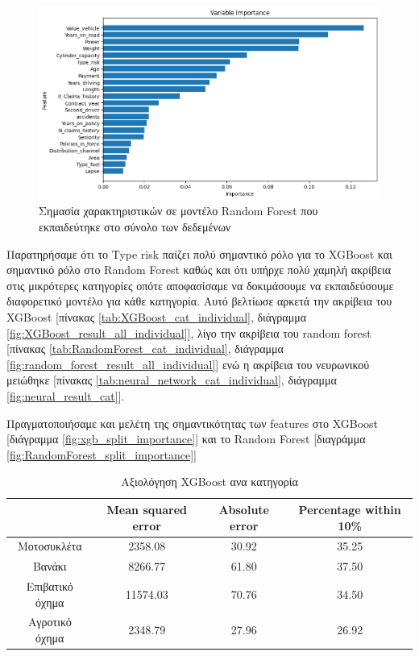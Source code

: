 \documentclass{llncs}
\begin{document}
\begin{figure}
    \begin{center}
        \includegraphics[width=1\textwidth]{images/feature_importance_combined_random_forest.png}
    \end{center}
    \caption{Σημασία χαρακτηριστικών σε μοντέλο Random Forest που εκπαιδεύτηκε στο σύνολο των δεδεμένων}  
    \label{fig:random_forest_all_feature_importance}  
\end{figure}

Παρατηρήσαμε ότι το Type risk παίζει πολύ σημαντικό ρόλο για το XGBoost και σημαντικό ρόλο στο
Random Forest καθώς και ότι υπήρχε πολύ χαμηλή ακρίβεια στις μικρότερες κατηγορίες οπότε
αποφασίσαμε να δοκιμάσουμε να εκπαιδεύσουμε διαφορετικό μοντέλο για κάθε κατηγορία. Αυτό βελτίωσε αρκετά την ακρίβεια 
του XGBoost [πίνακας \ref{tab:XGBoost_cat_individual}, διάγραμμα \ref{fig:XGBoost_result_all_individual}], 
λίγο την ακρίβεια του random forest [πίνακας \ref{tab:RandomForest_cat_individual}, διάγραμμα \ref{fig:random_forest_result_all_individual}] 
ενώ η ακρίβεια του νευρωνικού μειώθηκε [πίνακας \ref{tab:neural_network_cat_individual}, διάγραμμα \ref{fig:neural_result_cat}].

Πραγματοποιήσαμε και μελέτη της σημαντικότητας των features 
στο XGBoost [διάγραμμα \ref{fig:xgb_split_importance}] και 
το Random Forest [διαγράμμα \ref{fig:RandomForest_split_importance}]

\begin{table}
    \centering
    \begin{tabular}{|c|c|c|c|} %
        \hline
         &Mean squared error & Absolute error & Percentage within 10\% \\ %
        \hline
        Μοτοσυκλέτα & 2358.08 & 30.92 & 35.25 \\
        Βανάκι & 8266.77 & 61.80 & 37.50 \\
        Επιβατικό όχημα & 11574.03 & 70.76 & 34.50 \\
        Αγροτικό όχημα & 2348.79 & 27.96 & 26.92 \\
        \hline
    \end{tabular}
    \caption{Αξιολόγηση XGBoost ανα κατηγορία}
    \label{tab:XGBoost_cat_together}
\end{table}
\end{document}
